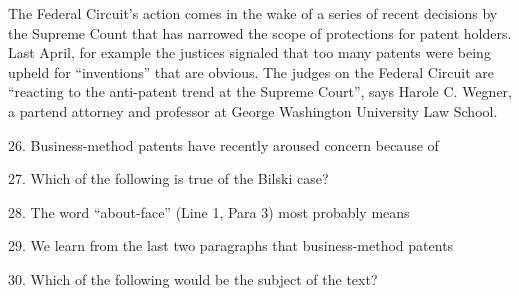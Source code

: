 \qquad The Federal Circuit's action comes in the wake of  a  series of recent decisions by the Supreme  Count that has narrowed the scope of protections for patent holders. Last April, for example the justices signaled that too many patents were being upheld for ``inventions'' that are obvious. The judges on the Federal Circuit are ``reacting to the anti-patent trend at the Supreme Court'', says Harole C. Wegner, a partend attorney and professor at George Washington University Law School.

\vspace{6pt}

26. Business-method patents have recently aroused concern because of\par

27. Which of the following is true of the Bilski case?\par

28. The word ``about-face'' (Line 1, Para 3) most probably means\par

29. We learn from the last two paragraphs that business-method patents\par

30. Which of the following would be the subject of the text?\par
